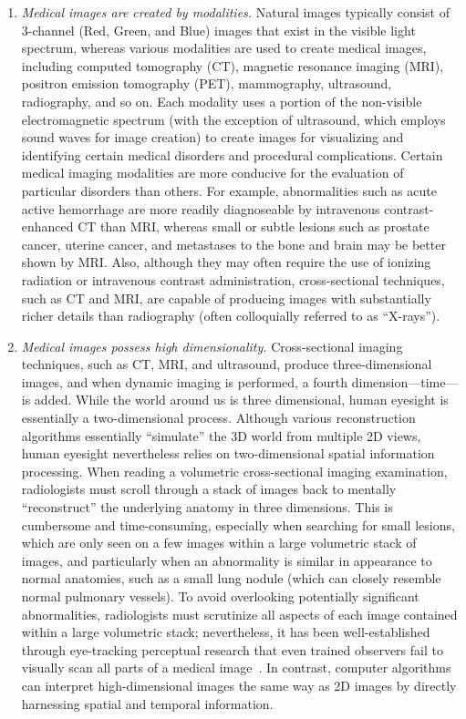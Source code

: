 \begin{enumerate}
    
    \item \textit{Medical images are created by modalities.} Natural images typically consist of 3-channel (Red, Green, and Blue) images that exist in the visible light spectrum, whereas various modalities are used to create medical images, including computed tomography (CT), magnetic resonance imaging (MRI), positron emission tomography (PET), mammography, ultrasound, radiography, and so on. Each modality uses a portion of the non-visible electromagnetic spectrum (with the exception of ultrasound, which employs sound waves for image creation) to create images for visualizing and identifying certain medical disorders and procedural complications. Certain medical imaging modalities are more conducive for the evaluation of particular disorders than others. For example, abnormalities such as acute active hemorrhage are more readily diagnoseable by intravenous contrast-enhanced CT than MRI, whereas small or subtle lesions such as prostate cancer, uterine cancer, and metastases to the bone and brain may be better shown by MRI. Also, although they may often require the use of ionizing radiation or intravenous contrast administration, cross-sectional techniques, such as CT and MRI, are capable of producing images with substantially richer details than radiography (often colloquially referred to as ``X-rays'').
    
    \item \textit{Medical images possess high dimensionality.} Cross-sectional imaging techniques, such as CT, MRI, and ultrasound, produce three-dimensional images, and when dynamic imaging is performed, a fourth dimension---time---is added. While the world around us is three dimensional, human eyesight is essentially a two-dimensional process. Although various reconstruction algorithms essentially ``simulate'' the 3D world from multiple 2D views, human eyesight nevertheless relies on two-dimensional spatial information processing. When reading a volumetric cross-sectional imaging examination, radiologists must scroll through a stack of images back to mentally ``reconstruct''  the underlying anatomy in three dimensions. This is cumbersome and time-consuming, especially when searching for small lesions, which are only seen on a few images within a large volumetric stack of images, and particularly when an abnormality is similar in appearance to normal anatomies, such as a small lung nodule (which can closely resemble normal pulmonary vessels). To avoid overlooking potentially significant abnormalities, radiologists must scrutinize all aspects of each image contained within a large volumetric stack; nevertheless, it has been well-established through eye-tracking perceptual research that even trained observers fail to visually scan all parts of a medical image~\citep{rubin2015characterizing}. In contrast, computer algorithms can interpret high-dimensional images the same way as 2D images by directly harnessing spatial and temporal information. 
    

\end{enumerate}
